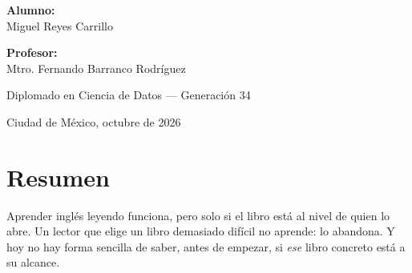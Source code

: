 \documentclass[11pt,a4paper]{article}
\newcommand{\pct}{\,\%}
\begin{document}
\begin{titlepage}
{\large
\textbf{Alumno:}\\
Miguel Reyes Carrillo
\par}

\vspace{0.7cm}

{\large
\textbf{Profesor:}\\
Mtro. Fernando Barranco Rodríguez
\par}

\vspace{0.7cm}

{\large
Diplomado en Ciencia de Datos --- Generación 34
\par}

\vfill


\vspace{0.6cm}

{\normalsize Ciudad de México, octubre de 2026\par}

\end{titlepage}

\section*{Resumen}

Aprender inglés leyendo funciona, pero solo si el libro está al nivel de quien lo
abre. Un lector que elige un libro demasiado difícil no aprende: lo abandona. Y hoy
no hay forma sencilla de saber, antes de empezar, si \emph{ese} libro concreto está a
su alcance.
\end{document}

